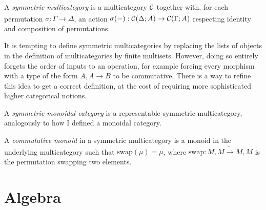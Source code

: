 \begin{definition}
  A \emph{symmetric multicategory} is a multicategory $\mathcal C$ together with, for
  each permutation $\sigma : \Gamma \tilde\to \Delta$, an action
  $\sigma(-) : \mathcal C(\Delta; A) \to \mathcal C(\Gamma; A)$ respecting identity and
  composition of permutations.
\end{definition}

\begin{remark}
  It is tempting to define symmetric multicategories by replacing the lists of
  objects in the definition of multicategories by finite multisets.
  However, doing so entirely forgets the order of inputs to an operation, for
  example forcing every morphism with a type of the form $A, A \to B$ to be
  commutative.
  There is a way to refine this idea to get a correct definition, at the cost of
  requiring more sophisticated higher categorical notions.
\end{remark}

\begin{definition}
  A \emph{symmetric monoidal category} is a representable symmetric
  multicategory, analogously to how I defined a monoidal category.
\end{definition}

\begin{definition}
  A \emph{commutative monoid} in a symmetric multicategory is a monoid in the
  underlying multicategory such that $\mathrm{swap}(\mu) = \mu$, where
  $\mathrm{swap} : M, M \tilde\to M, M$ is the permutation swapping two
  elements.
\end{definition}

\section{Algebra}
